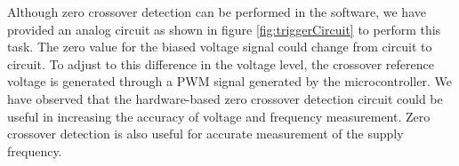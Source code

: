 Although zero crossover detection can be performed in the software, we have provided an analog circuit as shown in figure \ref{fig:triggerCircuit} to perform this task. The zero value for the biased voltage signal could change from circuit to circuit. To adjust to this difference in the voltage level, the crossover reference voltage is generated through a PWM signal generated by the microcontroller. We have observed that the hardware-based zero crossover detection circuit could be useful in increasing the accuracy of voltage and frequency measurement. Zero crossover detection is also useful for accurate measurement of the supply frequency.
